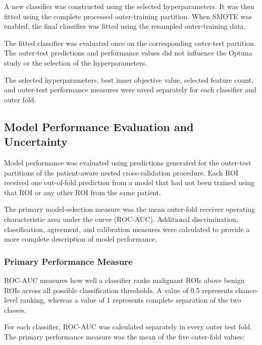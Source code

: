 \documentclass[12pt,twocolumn]{article}
\begin{document}
A new classifier was constructed using the selected hyperparameters.
It was then fitted using the complete processed outer-training
partition. When SMOTE was enabled, the final classifier was fitted
using the resampled outer-training data.

The fitted classifier was evaluated once on the corresponding
outer-test partition. The outer-test predictions and performance
values did not influence the Optuna study or the selection of the
hyperparameters.

The selected hyperparameters, best inner objective value, selected
feature count, and outer-test performance measures were saved
separately for each classifier and outer fold.









\subsection{Model Performance Evaluation and Uncertainty}
\label{subsec:model_evaluation}

Model performance was evaluated using predictions generated for the
outer-test partitions of the patient-aware nested cross-validation
procedure. Each ROI received one out-of-fold prediction from a model
that had not been trained using that ROI or any other ROI from the
same patient.

The primary model-selection measure was the mean outer-fold
receiver operating characteristic area under the curve (ROC-AUC).
Additional discrimination, classification, agreement, and calibration
measures were calculated to provide a more complete description of
model performance.






\subsubsection{Primary Performance Measure}
\label{subsubsec:primary_performance_measure}

ROC-AUC measures how well a classifier ranks malignant ROIs above
benign ROIs across all possible classification thresholds. A value of
0.5 represents chance-level ranking, whereas a value of 1 represents
complete separation of the two classes.

For each classifier, ROC-AUC was calculated separately in every outer
test fold. The primary performance measure was the mean of the five
outer-fold values:
\end{document}
